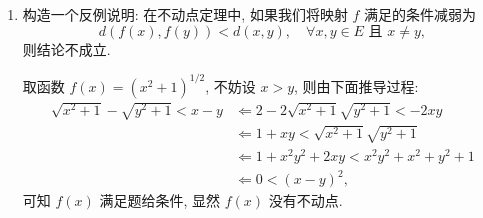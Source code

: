 \begin{enumerate}
  \item 构造一个反例说明: 在不动点定理中, 如果我们将映射 $f$ 满足的条件减弱为
  \[d(f(x),f(y))<d(x,y),\quad\forall x,y\in E\text{\ 且\ }x\neq y,\]
  则结论不成立.
    \begin{answer}
      取函数 $f(x)=(x^2+1)^{1/2}$, 不妨设 $x>y$, 则由下面推导过程:
      \begin{align*}
          \sqrt{x^2+1}-\sqrt{y^2+1}<x-y
          &\Leftarrow 2-2\sqrt{x^2+1}\sqrt{y^2+1}<-2xy\\
          &\Leftarrow 1+xy<\sqrt{x^2+1}\sqrt{y^2+1}\\
          &\Leftarrow 1+x^2y^2+2xy<x^2y^2+x^2+y^2+1\\
          &\Leftarrow 0<(x-y)^2,
      \end{align*}
      可知 $f(x)$ 满足题给条件, 显然 $f(x)$ 没有不动点.
    \end{answer}


\end{enumerate}
